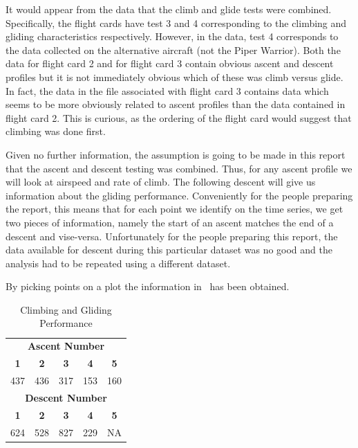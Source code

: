\documentclass[conf]{new-aiaa}
\begin{document}
It would appear from the data that the climb and glide tests were combined. Specifically, the flight cards have test 3 and 4 corresponding to the climbing and gliding characteristics respectively. However, in the data, test 4 corresponds to the data collected on the alternative aircraft (not the Piper Warrior). Both the data for flight card 2 and for flight card 3 contain obvious ascent and descent profiles but it is not immediately obvious which of these was climb versus glide. In fact, the data in the file associated with flight card 3 contains data which seems to be more obviously related to ascent profiles than the data contained in flight card 2. This is curious, as the ordering of the flight card would suggest that climbing was done first.

Given no further information, the assumption is going to be made in this report that the ascent and descent testing was combined. Thus, for any ascent profile we will look at airspeed and rate of climb. The following descent will give us information about the gliding performance. Conveniently for the people preparing the report, this means that for each point we identify on the time series, we get two pieces of information, namely the start of an ascent matches the end of a descent and vise-versa. Unfortunately for the people preparing this report, the data available for descent during this particular dataset was no good and the analysis had to be repeated using a different dataset.

By picking points on a plot the information in~ has been obtained.

\begin{table}[htp!]
\centering
\caption{Climbing and Gliding Performance}
\label{climbglide}
\begin{tabular}{ c | c | c | c | c }
	\multicolumn{5}{c}{\textbf{Ascent Number}}										\\
	\textbf{1} & \textbf{2} & \textbf{3} & \textbf{4}	& \textbf{5}								\\
	\hline
	\SI{437}{\fpm} & \SI{436}{\foot} & \SI{317}{\foot} & \SI{153}{\foot} & \SI{160}{\fpm}		\\
	\hline
	\multicolumn{5}{c}{\textbf{Descent Number}}										\\
	\textbf{1} & \textbf{2} & \textbf{3} & \textbf{4}	& \textbf{5}						\\
	\hline
	\SI{624}{\fpm} & \SI{528}{\foot} & \SI{827}{\foot} & \SI{229}{\foot}  & NA		\\
\end{tabular}
\end{table}
\end{document}
